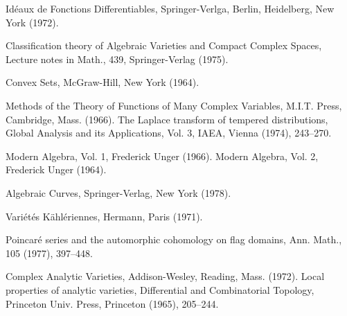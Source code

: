 \begin{sourcebibliography}
 Id\'eaux de Fonctions Differentiables, Springer-Verlga, Berlin, Heidelberg, New York (1972).
\end{sourcebibliography}
\begin{sourcebibliography}
 Classification theory of Algebraic Varieties and Compact Complex Spaces, Lecture notes in Math., 439, Springer-Verlag (1975).
\end{sourcebibliography}
\begin{sourcebibliography}
 Convex Sets, McGraw-Hill, New York (1964).
\end{sourcebibliography}
\begin{sourcebibliography}
 Methods of the Theory of Functions of Many Complex Variables, M.I.T. Press, Cambridge, Mass. (1966).
 The Laplace transform of tempered distributions, Global Analysis and its Applications, Vol. 3, IAEA, Vienna (1974), 243--270.
\end{sourcebibliography}
\begin{sourcebibliography}
 Modern Algebra, Vol. 1, Frederick Unger (1966).
 Modern Algebra, Vol. 2, Frederick Unger (1964).
\end{sourcebibliography}
\begin{sourcebibliography}
 Algebraic Curves, Springer-Verlag, New York (1978).
\end{sourcebibliography}
\begin{sourcebibliography}
 Vari\'et\'es K\"ahl\'eriennes, Hermann, Paris (1971).
\end{sourcebibliography}
\begin{sourcebibliography}
 Poincar\'e series and the automorphic cohomology on flag domains, Ann. Math., 105 (1977), 397--448.
\end{sourcebibliography}
\begin{sourcebibliography}
 Complex Analytic Varieties, Addison-Wesley, Reading, Mass. (1972).
 Local properties of analytic varieties, Differential and Combinatorial Topology, Princeton Univ. Press, Princeton (1965), 205--244.
\end{sourcebibliography}
